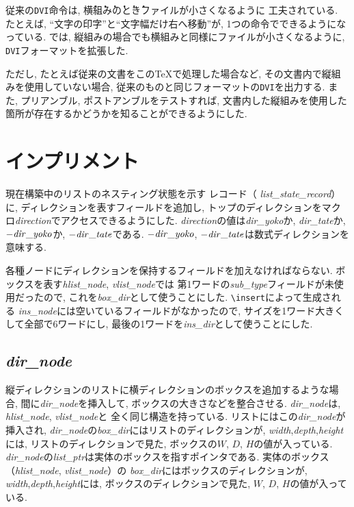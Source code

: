 従来の\verb|DVI|命令は, \.横\.組\.み\.の\.と\.きファイルが小さくなるように
工夫されている.
たとえば, ``文字の印字''と``文字幅だけ右へ移動''が,
1つの命令でできるようになっている.
\pTeX では, 縦組みの場合でも横組みと同様にファイルが小さくなるように,
\verb|DVI|フォーマットを拡張した.

ただし, たとえば従来の文書をこの\TeX で処理した場合など,
その文書内で縦組みを使用していない場合,
従来のものと同じフォーマットの{\tt DVI}を出力する.
また, プリアンブル, ポストアンブルをテストすれば,
文書内した縦組みを使用した箇所が存在するかどうかを知ることができるようにした.


\section{インプリメント} \label{imple}

現在構築中のリストのネスティング状態を示す
レコード（\kern0pt {\it list\_state\_record\/}）に,
ディレクションを表すフィールドを追加し,
トップのディレクションをマクロ{\it direction\/}でアクセスできるようにした.
{\it direction\/}の値は{\it dir\_yoko\/}か, {\it dir\_tate\/}か,
$-{\it dir\_yoko\/}$か, $-{\it dir\_tate\/}$である.
$-{\it dir\_yoko\/}$, $-{\it dir\_tate\/}$は数式ディレクションを意味する.

各種ノードにディレクションを保持するフィールドを加えなければならない.
ボックスを表す{\it hlist\_node\/}, {\it vlist\_node\/}では
第1ワードの{\it sub\_type}フィールドが未使用だったので,
これを{\it box\_dir\/}として使うことにした.
\verb|\insert|によって生成される
{\it ins\_node\/}には空いているフィールドがなかったので,
サイズを1ワード大きくして全部で6ワードにし,
最後の1ワードを{\it ins\_dir\/}として使うことにした.

\subsection{\it dir\_node}

縦ディレクションのリストに横ディレクションのボックスを追加するような場合,
間に{\it dir\_node\/}を挿入して, ボックスの大きさなどを整合させる.
{\it dir\_node\/}は, {\it hlist\_node\/}, {\it vlist\_node\/}と
全く同じ構造を持っている.
リストにはこの{\it dir\_node\/}が挿入され,
{\it dir\_node\/}の{\it box\_dir\/}にはリストのディレクションが,
{\it width\/},{\it depth\/},{\it height\/}には,
リストのディレクションで見た, ボックスの$W$, $D$, $H$の値が入っている.
{\it dir\_node\/}の{\it list\_ptr\/}は実体のボックスを指すポインタである.
実体のボックス（{\it hlist\_node\/}, {\it vlist\_node\/}）の
{\it box\_dir\/}にはボックスのディレクションが,
{\it width\/},{\it depth\/},{\it height\/}には,
ボックスのディレクションで見た, $W$, $D$, $H$の値が入っている.

